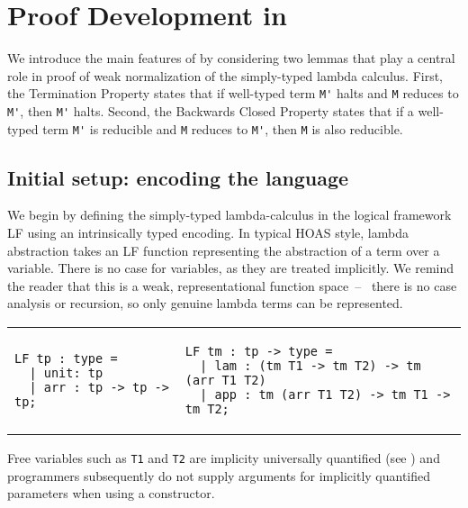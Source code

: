 
\renewcommand*{\arraystretch}{0.3}
\chapter{Proof Development in \Harpoon}
\label{sec:example}

We introduce the main features of \Harpoon{} by considering two
lemmas that play a central role in proof of weak normalization of
the simply-typed lambda calculus.
First, the Termination Property states that if
well-typed term \lstinline!M'! halts and \lstinline!M!
reduces to \lstinline!M'!, then \lstinline!M'! halts.
Second, the Backwards Closed Property states that if a well-typed term
\lstinline!M'! is reducible and \lstinline!M! reduces to \lstinline!M'!, then
\lstinline!M! is also reducible.


\section{Initial setup: encoding the language}
We begin by defining the simply-typed lambda-calculus in the logical
framework LF \cite{Harper93jacm} using an intrinsically typed
encoding.
In typical HOAS style, lambda abstraction takes an LF function representing the
abstraction of a term over a variable. There is no case for variables, as they
are treated implicitly.
We remind the reader that this is a weak, representational function space~--~%
there is no case analysis or recursion, so only genuine lambda terms can
be represented.
%
\begin{center}
\begin{tabular}{ll}
\begin{lstlisting}
LF tp : type =
  | unit: tp
  | arr : tp -> tp -> tp;
\end{lstlisting}
  &
\begin{lstlisting}
LF tm : tp -> type =
  | lam : (tm T1 -> tm T2) -> tm (arr T1 T2)
  | app : tm (arr T1 T2) -> tm T1 -> tm T2;
\end{lstlisting}
\end{tabular}
\end{center}
%
Free variables such as \lstinline!T1! and \lstinline!T2! are
implicity universally quantified (see \cite{Pientka:JFP13})
and programmers subsequently do not supply arguments for
implicitly quantified parameters when using a constructor.




